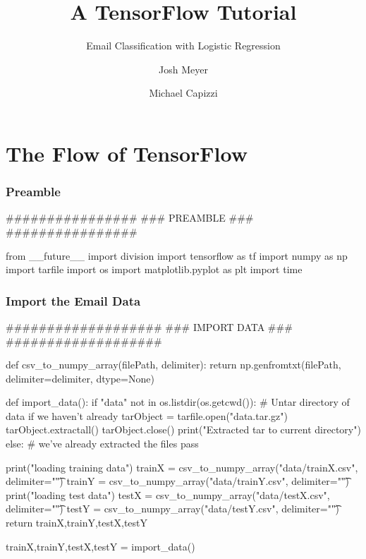 \documentclass[14pt]{beamer}
\begin{document}
\title{A TensorFlow Tutorial}  
\subtitle{Email Classification with Logistic Regression}
\author{Josh Meyer  \and Michael Capizzi }
\date{} 

\frame{\titlepage} 




\section{The Flow of TensorFlow}

\begin{frame}[fragile]
  \frametitle{Preamble}
  \begin{python}
################
### PREAMBLE ###
################

from __future__ import division
import tensorflow as tf
import numpy as np
import tarfile
import os
import matplotlib.pyplot as plt
import time
  \end{python}
\end{frame}


\begin{frame}[fragile]
  \frametitle{Import the Email Data}
  \begin{python}
###################
### IMPORT DATA ###
###################

def csv_to_numpy_array(filePath, delimiter):
    return np.genfromtxt(filePath, delimiter=delimiter, dtype=None)

def import_data():
    if "data" not in os.listdir(os.getcwd()):
        # Untar directory of data if we haven't already
        tarObject = tarfile.open("data.tar.gz")
        tarObject.extractall()
        tarObject.close()
        print("Extracted tar to current directory")
    else:
        # we've already extracted the files
        pass

    print("loading training data")
    trainX = csv_to_numpy_array("data/trainX.csv", delimiter="\t")
    trainY = csv_to_numpy_array("data/trainY.csv", delimiter="\t")
    print("loading test data")
    testX = csv_to_numpy_array("data/testX.csv", delimiter="\t")
    testY = csv_to_numpy_array("data/testY.csv", delimiter="\t")
    return trainX,trainY,testX,testY

trainX,trainY,testX,testY = import_data()
  \end{python}
\end{frame}
\end{document}
